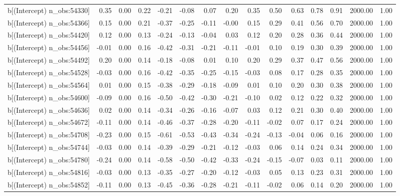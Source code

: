 \begin{table}[ht]
\begin{tabular}{rrrrrrrrrrrrrrr}
  b[(Intercept) n\_obs:54330] & 0.35 & 0.00 & 0.22 & -0.21 & -0.08 & 0.07 & 0.20 & 0.35 & 0.50 & 0.63 & 0.78 & 0.91 & 2000.00 & 1.00 \\ 
  b[(Intercept) n\_obs:54366] & 0.15 & 0.00 & 0.21 & -0.37 & -0.25 & -0.11 & -0.00 & 0.15 & 0.29 & 0.41 & 0.56 & 0.70 & 2000.00 & 1.00 \\ 
  b[(Intercept) n\_obs:54420] & 0.12 & 0.00 & 0.13 & -0.24 & -0.13 & -0.04 & 0.03 & 0.12 & 0.20 & 0.28 & 0.36 & 0.44 & 2000.00 & 1.00 \\ 
  b[(Intercept) n\_obs:54456] & -0.01 & 0.00 & 0.16 & -0.42 & -0.31 & -0.21 & -0.11 & -0.01 & 0.10 & 0.19 & 0.30 & 0.39 & 2000.00 & 1.00 \\ 
  b[(Intercept) n\_obs:54492] & 0.20 & 0.00 & 0.14 & -0.18 & -0.08 & 0.01 & 0.10 & 0.20 & 0.29 & 0.37 & 0.47 & 0.56 & 2000.00 & 1.00 \\ 
  b[(Intercept) n\_obs:54528] & -0.03 & 0.00 & 0.16 & -0.42 & -0.35 & -0.25 & -0.15 & -0.03 & 0.08 & 0.17 & 0.28 & 0.35 & 2000.00 & 1.00 \\ 
  b[(Intercept) n\_obs:54564] & 0.01 & 0.00 & 0.15 & -0.38 & -0.29 & -0.18 & -0.09 & 0.01 & 0.10 & 0.20 & 0.30 & 0.38 & 2000.00 & 1.00 \\ 
  b[(Intercept) n\_obs:54600] & -0.09 & 0.00 & 0.16 & -0.50 & -0.42 & -0.30 & -0.21 & -0.10 & 0.02 & 0.12 & 0.22 & 0.32 & 2000.00 & 1.00 \\ 
  b[(Intercept) n\_obs:54636] & 0.02 & 0.00 & 0.14 & -0.34 & -0.26 & -0.16 & -0.07 & 0.03 & 0.12 & 0.21 & 0.30 & 0.40 & 2000.00 & 1.00 \\ 
  b[(Intercept) n\_obs:54672] & -0.11 & 0.00 & 0.14 & -0.46 & -0.37 & -0.28 & -0.20 & -0.11 & -0.02 & 0.07 & 0.17 & 0.24 & 2000.00 & 1.00 \\ 
  b[(Intercept) n\_obs:54708] & -0.23 & 0.00 & 0.15 & -0.61 & -0.53 & -0.43 & -0.34 & -0.24 & -0.13 & -0.04 & 0.06 & 0.16 & 2000.00 & 1.00 \\ 
  b[(Intercept) n\_obs:54744] & -0.03 & 0.00 & 0.14 & -0.39 & -0.29 & -0.21 & -0.12 & -0.03 & 0.06 & 0.14 & 0.24 & 0.34 & 2000.00 & 1.00 \\ 
  b[(Intercept) n\_obs:54780] & -0.24 & 0.00 & 0.14 & -0.58 & -0.50 & -0.42 & -0.33 & -0.24 & -0.15 & -0.07 & 0.03 & 0.11 & 2000.00 & 1.00 \\ 
  b[(Intercept) n\_obs:54816] & -0.03 & 0.00 & 0.13 & -0.35 & -0.27 & -0.20 & -0.12 & -0.03 & 0.05 & 0.13 & 0.23 & 0.31 & 2000.00 & 1.00 \\ 
  b[(Intercept) n\_obs:54852] & -0.11 & 0.00 & 0.13 & -0.45 & -0.36 & -0.28 & -0.21 & -0.11 & -0.02 & 0.06 & 0.14 & 0.20 & 2000.00 & 1.00 \\ 

\end{tabular}
\end{table}
